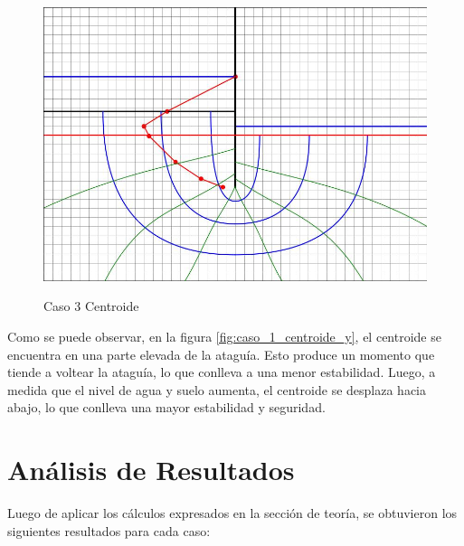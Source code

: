 \begin{figure}[H]
\begin{minipage}{0.32\textwidth}
        \centering
        \includegraphics[width=\textwidth]{GRAFICOS/caso_3_centroide_y.jpg}
        \caption{Caso 3 Centroide}
        \label{fig:caso_3_centroide_y}
    \end{minipage}
\end{figure}

Como se puede observar, en la figura \ref{fig:caso_1_centroide_y}, el centroide se encuentra en una parte elevada de la ataguía. Esto produce un momento que tiende a voltear la ataguía, lo que conlleva a una menor estabilidad. Luego, a medida que el nivel de agua y suelo aumenta, el centroide se desplaza hacia abajo, lo que conlleva una mayor estabilidad y seguridad. 

\section{Análisis de Resultados}

Luego de aplicar los cálculos expresados en la sección de teoría, se obtuvieron los siguientes resultados para cada caso:

